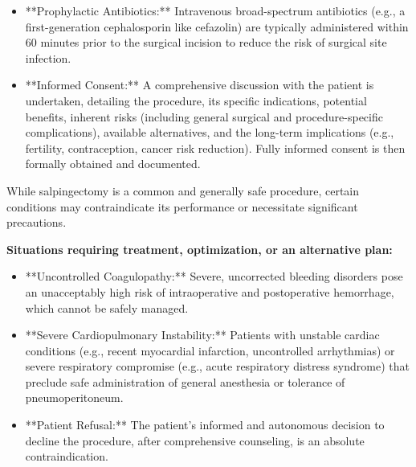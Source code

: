 \begin{itemize}
  \item **Prophylactic Antibiotics:** Intravenous broad-spectrum antibiotics (e.g., a first-generation cephalosporin like cefazolin) are typically administered within 60 minutes prior to the surgical incision to reduce the risk of surgical site infection.
  \item **Informed Consent:** A comprehensive discussion with the patient is undertaken, detailing the procedure, its specific indications, potential benefits, inherent risks (including general surgical and procedure-specific complications), available alternatives, and the long-term implications (e.g., fertility, contraception, cancer risk reduction). Fully informed consent is then formally obtained and documented.
\end{itemize}

While salpingectomy is a common and generally safe procedure, certain conditions may contraindicate its performance or necessitate significant precautions.

\textbf{Situations requiring treatment, optimization, or an alternative plan:}
\begin{itemize}
  \item **Uncontrolled Coagulopathy:** Severe, uncorrected bleeding disorders pose an unacceptably high risk of intraoperative and postoperative hemorrhage, which cannot be safely managed.
  \item **Severe Cardiopulmonary Instability:** Patients with unstable cardiac conditions (e.g., recent myocardial infarction, uncontrolled arrhythmias) or severe respiratory compromise (e.g., acute respiratory distress syndrome) that preclude safe administration of general anesthesia or tolerance of pneumoperitoneum.
  \item **Patient Refusal:** The patient's informed and autonomous decision to decline the procedure, after comprehensive counseling, is an absolute contraindication.
\end{itemize}

